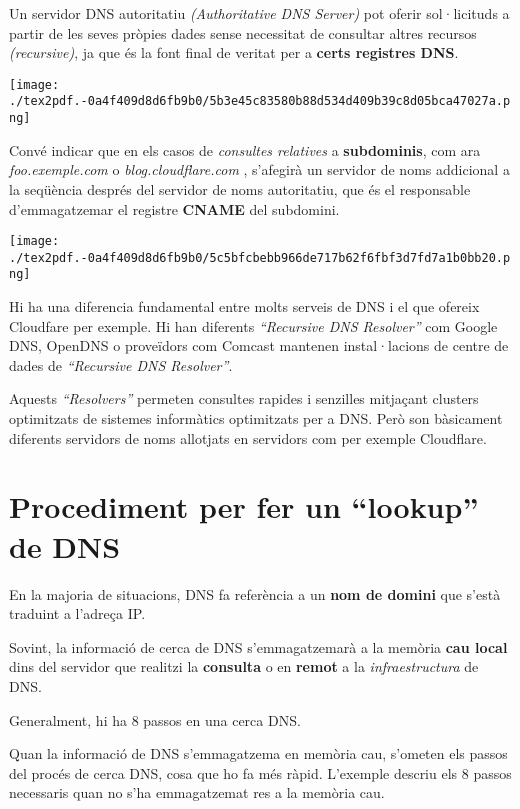 \documentclass[]{article}
\begin{document}
Un servidor DNS autoritatiu \emph{(Authoritative DNS Server)} pot oferir
sol·licituds a partir de les seves pròpies dades sense necessitat de
consultar altres recursos \emph{(recursive)}, ja que és la font final de
veritat per a \textbf{certs registres DNS}.

\texttt{[image: ./tex2pdf.-0a4f409d8d6fb9b0/5b3e45c83580b88d534d409b39c8d05bca47027a.png]}

Convé indicar que en els casos de \emph{consultes relatives} a
\textbf{subdominis}, com ara \emph{foo.exemple.com} o
\emph{blog.cloudflare.com} , s'afegirà un servidor de noms addicional a
la seqüència després del servidor de noms autoritatiu, que és el
responsable d'emmagatzemar el registre \textbf{CNAME} del subdomini.

\texttt{[image: ./tex2pdf.-0a4f409d8d6fb9b0/5c5bfcbebb966de717b62f6fbf3d7fd7a1b0bb20.png]}

Hi ha una diferencia fundamental entre molts serveis de DNS i el que
ofereix Cloudfare per exemple. Hi han diferents \emph{``Recursive DNS
Resolver''} com Google DNS, OpenDNS o proveïdors com Comcast mantenen
instal·lacions de centre de dades de \emph{``Recursive DNS Resolver''}.

Aquests \emph{``Resolvers''} permeten consultes rapides i senzilles
mitjaçant clusters optimitzats de sistemes informàtics optimitzats per a
DNS. Però son bàsicament diferents servidors de noms allotjats en
servidors com per exemple Cloudflare.

\hypertarget{procediment-per-fer-un-lookup-de-dns}{%
\section{\texorpdfstring{\textbf{Procediment per fer un ``lookup'' de
DNS}}{Procediment per fer un ``lookup'' de DNS}}\label{procediment-per-fer-un-lookup-de-dns}}

En la majoria de situacions, DNS fa referència a un \textbf{nom de
domini} que s'està traduint a l'adreça IP.

Sovint, la informació de cerca de DNS s'emmagatzemarà a la memòria
\textbf{cau local} dins del servidor que realitzi la \textbf{consulta} o
en \textbf{remot} a la \emph{infraestructura} de DNS.

Generalment, hi ha 8 passos en una cerca DNS.

Quan la informació de DNS s'emmagatzema en memòria cau, s'ometen els
passos del procés de cerca DNS, cosa que ho fa més ràpid. L'exemple
descriu els 8 passos necessaris quan no s'ha emmagatzemat res a la
memòria cau.
\end{document}
